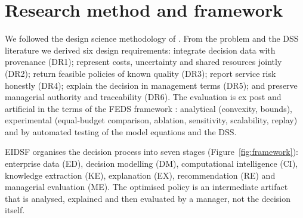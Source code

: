 \documentclass[preprint,12pt,authoryear]{elsarticle}
\begin{document}
\section{Research method and framework}\label{sec:method}\label{sec:framework}
We followed the design science methodology of \citet{Peffers2007}. From the problem and the DSS literature we derived six design requirements: integrate decision data with provenance (DR1); represent costs, uncertainty and shared resources jointly (DR2); return feasible policies of known quality (DR3); report service risk honestly (DR4); explain the decision in management terms (DR5); and preserve managerial authority and traceability (DR6). The evaluation is ex post and artificial in the terms of the FEDS framework \citep{Venable2016}: analytical (convexity, bounds), experimental (equal-budget comparison, ablation, sensitivity, scalability, replay) and by automated testing of the model equations and the DSS.

EIDSF organises the decision process into seven stages (Figure~\ref{fig:framework}): enterprise data (ED), decision modelling (DM), computational intelligence (CI), knowledge extraction (KE), explanation (EX), recommendation (RE) and managerial evaluation (ME). The optimised policy is an intermediate artifact that is analysed, explained and then evaluated by a manager, not the decision itself.
\end{document}
